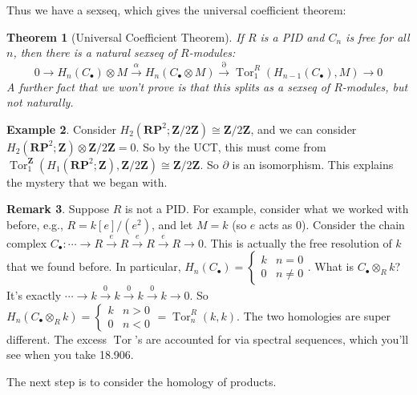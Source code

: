 \documentclass{amsart}
\theoremstyle{theorem}
\newtheorem{theorem}{Theorem}[section]
\theoremstyle{definition}
\newtheorem{remark}[theorem]{Remark}
\newtheorem{example}[theorem]{Example}
\DeclareMathOperator{\Tor}{Tor}
\newcommand{\RP}{\mathbf{RP}}
\newcommand{\Z}{\mathbf Z}
\begin{document}
Thus we have a sexseq, which gives the universal coefficient theorem:
\begin{theorem}[Universal Coefficient Theorem]
If $R$ is a PID and $C_n$ is free for all $n$, then there is a natural sexseq of $R$-modules:
\begin{equation*}
0\to H_n(C_\bullet)\otimes M\xrightarrow{\alpha} H_n(C_\bullet\otimes M)\xrightarrow{\partial}\Tor^R_1( H_{n-1}(C_\bullet),M)\to 0
\end{equation*}
A further fact that we won't prove is that this splits as a sexseq of $R$-modules, but not naturally.
\end{theorem}
\begin{example}
Consider $ H_2(\RP^2;\Z/2\Z)\cong\Z/2\Z$, and we can consider $ H_2(\RP^2;\Z)\otimes\Z/2\Z=0$. So by the UCT, this must come from $\Tor^\Z_1( H_1(\RP^2;\Z),\Z/2\Z)\cong\Z/2\Z$. So $\partial$ is an isomorphism. This explains the mystery that we began with.
\end{example}
\begin{remark}
Suppose $R$ is not a PID. For example, consider what we worked with before, e.g., $R=k[e]/(e^2)$, and let $M=k$ (so $e$ acts as $0$). Consider the chain complex $C_\bullet:\cdots\to R\xrightarrow{e}R\xrightarrow{e} R\xrightarrow{e}R\to 0$. This is actually the free resolution of $k$ that we found before. In particular, $ H_n(C_\bullet)=\begin{cases}k & n=0 \\ 0 & n\neq 0\end{cases}$. What is $C_\bullet\otimes_R k$? It's exactly $\cdots\to k\xrightarrow{0}k\xrightarrow{0} k\xrightarrow{0}k\to 0$. So $ H_n(C_\bullet\otimes_R k)=\begin{cases}k & n>0 \\ 0 & n<0\end{cases}=\Tor^R_n(k,k)$. The two homologies are super different. The excess $\Tor$'s are accounted for via spectral sequences, which you'll see when you take 18.906.
\end{remark}
The next step is to consider the homology of products.
\end{document}

